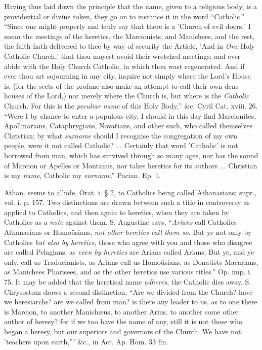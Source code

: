 Having thus laid down the principle that the
name, given to a religious body, is a providential or divine token,
they go on to instance it in the word ``Catholic.'' ``Since one might
properly and truly say that there is a 'Church of evil doers,' I
mean the meetings of the heretics, the Marcionists, and Manichees, and
the rest, the faith hath delivered to thee by way of security the
Article, 'And in \emph{One} Holy Catholic Church,' that thou mayest avoid their wretched
meetings; and ever abide with the Holy Church Catholic, in which thou
wast regenerated. And if ever thou art sojourning in any city, inquire
not simply where the Lord's House is, (for the sects of the profane
also make an attempt to call their own dens houses of the Lord,) nor
merely where the Church is, but where is the \emph{Catholic}
Church. For this is the \emph{peculiar name}
of this Holy Body,'' \&c. Cyril Cat. xviii. 26. ``Were I by
chance to enter a populous city, I should in this day find Marcionites,
Apollinarians, Cataphrygians, Novatians, and other such, who called
themselves Christian; by what \emph{surname}
should I recognise the congregation of my own people, were it
not called Catholic? ... Certainly that word 'Catholic' is not
borrowed from man, which has survived through so many ages, nor has
the sound of Marcion or Apelles or Montanus, nor takes heretics for
its authors ... Christian is my \emph{name},
Catholic my \emph{surname}.'' Pacian. Ep. 1.

Athan. seems to allude, Orat. i. § 2, to
Catholics being called Athanasians; supr., vol. i. p. 157. Two
distinctions are drawn between such a title in controversy as applied
to Catholics, and then again to heretics, when they are taken by
Catholics as a \emph{note} against
them. S. Augustine says, ``\emph{Arians}
call Catholics Athanasians or Homoüsians, \emph{not other}
\emph{heretics call them so}.
But ye not only by Catholics \emph{but also by heretics}, those who agree with you and those who disagree are called
Pelagians; as \emph{even by heretics}
are Arians called Arians. But ye, and ye only, call us
Traducianists, as Arians call us Homoüsians, as Donatists Macarians,
as Manichees Pharisees, and as the other heretics use various titles.''
Op. imp. i. 75. It may be added that the heretical name \emph{adheres},
the Catholic dies away. S. Chrysostom draws a second
distinction, ``Are we divided from the Church? have we heresiarchs? are
we called from man? is there any leader to us, as to one there is
Marcion, to another Manichæus, to another Arius, to another some
other author of heresy? for if we too have the name of any, still it
is not those who began a heresy, but our superiors and governors of
the Church. We have not 'teachers upon earth,''' \&c., in Act. Ap.
Hom. 33 fin.

